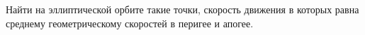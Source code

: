 Найти на эллиптической орбите такие точки, скорость движения в которых равна среднему геометрическому скоростей в перигее
и апогее.

